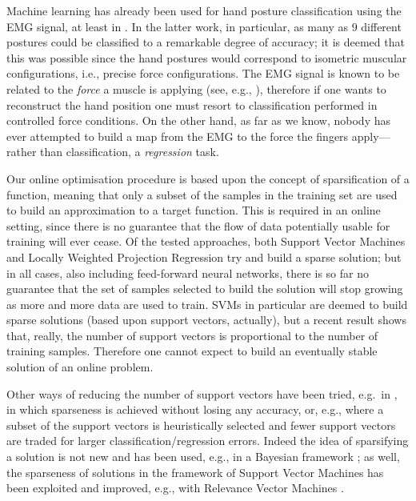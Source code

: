 Machine learning has already been used for hand posture classification
using the EMG signal, at least in \cite{dunlop,fukuda,smagt}. In the
latter work, in particular, as many as $9$ different postures could be
classified to a remarkable degree of accuracy; it is deemed that this
was possible since the hand postures would correspond to isometric
muscular configurations, i.e., precise force configurations. The EMG
signal is known to be related to the \emph{force} a muscle is applying
(see, e.g., \cite{deluca}), therefore if one wants to reconstruct the
hand position one must resort to classification performed in
controlled force conditions. On the other hand, as far as we know,
nobody has ever attempted to build a map from the EMG to the force the
fingers apply---rather than classification, a \emph{regression}
task.

Our online optimisation procedure is based upon the concept of
sparsification of a function, meaning that only a subset of the
samples in the training set are used to build an approximation to a
target function. This is required in an online setting, since there is
no guarantee that the flow of data potentially usable for training
will ever cease. Of the tested approaches, both Support Vector
Machines and Locally Weighted Projection Regression try and build a
sparse solution; but in all cases, also including feed-forward neural networks,
there is so far no guarantee that the set of samples selected to build
the solution will stop growing as more and more data are used to
train. SVMs in particular are deemed to build sparse solutions (based
upon support vectors, actually), but a recent result
\cite{Steinwart03} shows that, really, the number of support vectors
is proportional to the number of training samples. Therefore one
cannot expect to build an eventually stable solution of an online
problem.

Other ways of reducing the number of support vectors have been tried,
e.g.\ in \cite{bmvc}, in which sparseness is achieved without losing any
accuracy, or, e.g., \cite{LeeM01,KeerthiCDC06} where a subset of the
support vectors is heuristically selected and fewer support vectors are
traded for larger classification/regression errors. Indeed the idea of
sparsifying a solution is not new and has been used, e.g., in a
Bayesian framework \cite{figueiredo03adaptive}; as well, the
sparseness of solutions in the framework of Support Vector Machines
has been exploited and improved, e.g., with Relevance Vector Machines
\cite{tipping00relevance}.

